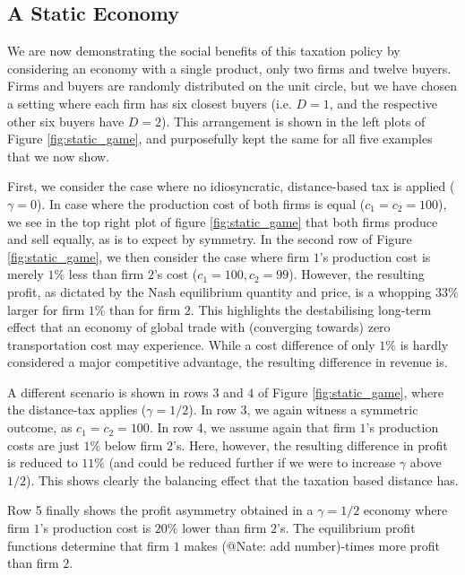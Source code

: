\documentclass[final,3p,times,authoryear,12pt]{elsarticle}
\newcommand{\red}[1]{\textcolor{WildStrawberry}{#1}} %
\begin{document}
\subsection{A Static Economy} 
\label{sec:static_economy}

We are now demonstrating the social benefits of this taxation policy by considering an economy with a single product, only two firms and twelve buyers. 
Firms and buyers are randomly distributed on the unit circle, but we have chosen a setting where each firm has six closest buyers (i.e. $D=1$, and the respective other six buyers have $D=2$). 
This arrangement is shown in the left plots of Figure \ref{fig:static_game}, and purposefully kept the same for all five examples that we now show. 

First, we consider the case where no idiosyncratic, distance-based tax is applied ($\gamma=0$). 
In case where the production cost of both firms is equal ($c_1=c_2 = 100$), we see in the top right plot of figure \ref{fig:static_game} that both firms produce and sell equally, as is to expect by symmetry. 
In the second row of Figure \ref{fig:static_game}, we then consider the case where firm $1$'s production cost is merely $1\%$ less than firm $2$'s cost ($c_1=100, c_2=99$). 
However, the resulting profit, as dictated by the Nash equilibrium quantity and price, is a whopping $33\%$ larger for firm $1\%$ than for firm $2$. 
This highlights the destabilising long-term effect that an economy of global trade with (converging towards) zero transportation cost may experience. 
While a cost difference of only $1\%$ is hardly considered a major competitive advantage, the resulting difference in revenue is. 

A different scenario is shown in rows $3$ and $4$ of Figure \ref{fig:static_game}, where the distance-tax applies ($\gamma = 1/2$).
In row 3, we again witness a symmetric outcome, as $c_1 = c_2 = 100$. 
In row 4, we assume again that firm $1$'s production costs are just $1\%$ below firm $2$'s. 
Here, however, the resulting difference in profit is reduced to $11\%$ (and could be reduced further if we were to increase $\gamma$  above $1/2$). 
This shows clearly the balancing effect that the taxation based distance has. 

Row 5 finally shows the profit asymmetry obtained in a $\gamma=1/2$ economy where firm $1$'s production cost is $20\%$ lower than firm $2$'s. 
The equilibrium profit functions determine that firm $1$ makes \red{(@Nate: add number)}-times more profit than firm $2$. 
\end{document}
